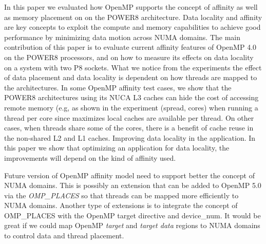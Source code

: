In this paper we evaluated how OpenMP supports the concept of affinity as well as memory placement on on the POWER8 architecture. 
Data locality and affinity are key concepts to exploit the compute and memory capabilities to achieve good performance by minimizing data motion across NUMA domains. 
The main contribution of this paper is to evaluate current affinity features of OpenMP 4.0 on the POWER8 processors, and on how to measure its 
effects on data locality on a system with two P8 sockets. What we notice from the experiments the effect of data placement and data locality is dependent on how threads 
are mapped to the architectures. In some OpenMP affinity test cases, we show that the POWER8 architectures using its NUCA L3 caches can hide the cost of accessing 
remote memory (e.g, as shown in the experiment (spread, cores) when running a thread per core since maximizes local caches are available per thread. On other cases, 
when threads share some of the cores, there is a benefit of cache reuse in the non-shared L2 and L1 caches. Improving data locality in the application. In this paper we show that optimizing an application for data locality, the improvements will depend on the kind of affinity used. 

Future version of OpenMP affinity model need to support better the concept of NUMA domains. This is possibly an extension that can be added
to OpenMP 5.0 via the \emph{OMP\_PLACES} so that threads can be mapped more efficiently to NUMA domains. Another type of extensions is to integrate
the concept of OMP\_PLACES with the OpenMP target directive and device\_num. It would be great if we could map OpenMP \emph{target} and \emph{target data} 
regions to NUMA domains to control data and thread placement.
